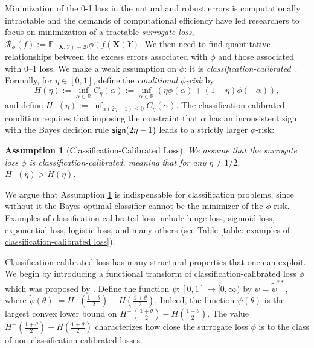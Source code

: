 \documentclass[11pt]{article}
\newcommand{\sign}{\textup{\textsf{sign}}}
\newtheorem{assumption}{Assumption}
\newcommand{\R}{\mathbb{R}}
\newcommand{\X}{\bm{X}}
\newcommand{\0}{\mathbf{0}}
\newcommand{\1}{\mathbf{1}}
\newcommand{\cD}{\mathcal{D}}
\newcommand{\cR}{\mathcal{R}}
\newcommand{\bbE}{\mathbb{E}}
\begin{document}
Minimization of the 0-1 loss in the natural and robust errors is computationally intractable and the demands of computational efficiency have led researchers to focus on minimization of a tractable \emph{surrogate loss}, $\cR_\phi(f):=\bbE_{(\X,Y)\sim\cD}\phi(f(\X)Y)$.  We then need to find quantitative relationships between the excess errors associated with $\phi$ and those associated with 0–1 loss. We make a weak assumption on $\phi$: it is \emph{classification-calibrated}~\cite{bartlett2006convexity}.  Formally, for $\eta\in[0,1]$, define the \emph{conditional $\phi$-risk} by
\begin{equation*}
H(\eta):=\inf_{\alpha\in\R} C_\eta(\alpha):=\inf_{\alpha\in\R} \left(\eta\phi(\alpha)+(1-\eta)\phi(-\alpha)\right),
\end{equation*}
and define $H^-(\eta):=\inf_{\alpha(2\eta-1)\le 0} C_\eta(\alpha)$. The classification-calibrated condition requires that imposing the
constraint that $\alpha$ has an inconsistent sign with the Bayes decision rule $\sign(2\eta-1)$ leads to a strictly larger $\phi$-risk:
\begin{assumption}[Classification-Calibrated Loss]
\label{assumption: classification-calibrated}
We assume that the surrogate loss $\phi$ is classification-calibrated, meaning that for any $\eta\not=1/2$, $H^-(\eta)>H(\eta)$.
\end{assumption}
We argue that Assumption \ref{assumption: classification-calibrated} is indispensable for classification problems, since without it the Bayes optimal classifier cannot be the minimizer of the $\phi$-risk.
Examples of classification-calibrated loss include hinge loss, sigmoid loss, exponential loss, logistic loss, and many others (see Table \ref{table: examples of classification-calibrated loss}).

\medskip
{} Classification-calibrated loss has many structural properties that one can exploit. We begin by introducing a functional transform of classification-calibrated loss $\phi$ which was proposed by \cite{bartlett2006convexity}.  Define the function $\psi:[0,1]\rightarrow[0,\infty)$ by $\psi=\widetilde\psi^{**}$, where
$\widetilde\psi(\theta):=H^-\left(\frac{1+\theta}{2}\right)-H\left(\frac{1+\theta}{2}\right)$. Indeed, the function $\psi(\theta)$ is the largest convex lower bound on $H^-\left(\frac{1+\theta}{2}\right)-H\left(\frac{1+\theta}{2}\right)$. The value $H^-\left(\frac{1+\theta}{2}\right)-H\left(\frac{1+\theta}{2}\right)$ characterizes how close the surrogate loss $\phi$ is to the class of non-classification-calibrated losses.
\end{document}
